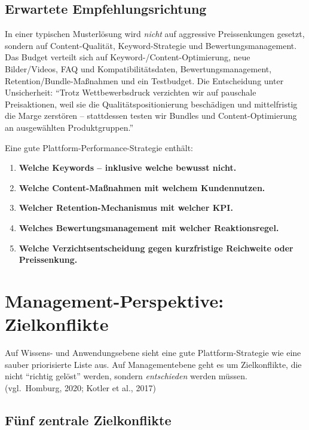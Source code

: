 \documentclass[11pt,a4paper,oneside]{article}
\newcommand{\quelle}[1]{{\footnotesize\color{lpGray}(#1)}}
\begin{document}
\subsection{Erwartete Empfehlungsrichtung}

In einer typischen Musterlösung wird \emph{nicht} auf aggressive Preissenkungen gesetzt, sondern auf Content-Qualität, Keyword-Strategie und Bewertungsmanagement. Das Budget verteilt sich auf Keyword-/Content-Optimierung, neue Bilder/Videos, FAQ und Kompatibilitätsdaten, Bewertungsmanagement, Retention/Bundle-Maßnahmen und ein Testbudget. Die Entscheidung unter Unsicherheit: ``Trotz Wettbewerbsdruck verzichten wir auf pauschale Preisaktionen, weil sie die Qualitätspositionierung beschädigen und mittelfristig die Marge zerstören -- stattdessen testen wir Bundles und Content-Optimierung an ausgewählten Produktgruppen.''

\begin{merkbox}
Eine gute Plattform-Performance-Strategie enthält:
\begin{enumerate}
  \item \textbf{Welche Keywords -- inklusive welche bewusst nicht.}
  \item \textbf{Welche Content-Maßnahmen mit welchem Kundennutzen.}
  \item \textbf{Welcher Retention-Mechanismus mit welcher KPI.}
  \item \textbf{Welches Bewertungsmanagement mit welcher Reaktionsregel.}
  \item \textbf{Welche Verzichtsentscheidung gegen kurzfristige Reichweite oder Preissenkung.}
\end{enumerate}
\end{merkbox}

\section{Management-Perspektive: Zielkonflikte}

Auf Wissens- und Anwendungsebene sieht eine gute Plattform-Strategie wie eine sauber priorisierte Liste aus. Auf Managementebene geht es um Zielkonflikte, die nicht ``richtig gelöst'' werden, sondern \emph{entschieden} werden müssen. \quelle{vgl.\ Homburg, 2020; Kotler et al., 2017}

\subsection{Fünf zentrale Zielkonflikte}
\end{document}
